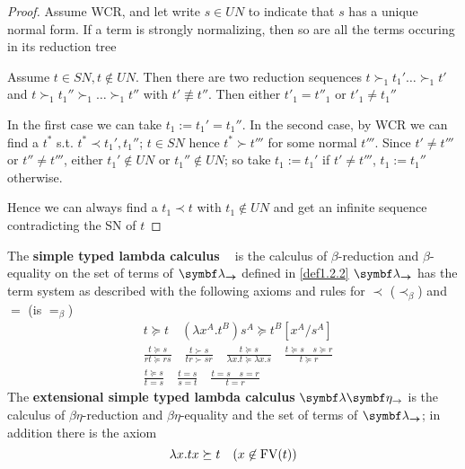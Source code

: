 \documentclass[11pt]{article}
\DeclareMathOperator{\blambdato}{\symbf{\lambda_\to}}
\begin{document}
\begin{proof}
Assume WCR, and let write \(s\in UN\) to indicate that \(s\) has a unique normal
form. If a term is strongly normalizing, then so are all the terms occuring
in its reduction tree

Assume \(t\in SN, t\not\in UN\). Then there are two reduction sequences
\(t\succ_1 t_1'\dots\succ_1 t'\) and \(t\succ_1 t_1''\succ_1\dots\succ_1 t''\) with
\(t'\not\equiv t''\). Then either \(t'_1=t''_1\) or \(t'_1\neq t_1''\)

In the first case we can take \(t_1:=t_1'=t_1''\). In the second case, by WCR
we can find a \(t^*\) s.t. \(t^*\prec t_1',t_1''\); \(t\in SN\) hence \(t^*\succ
   t'''\) for some normal \(t'''\). Since \(t'\neq t'''\) or \(t''\neq t'''\), either
\(t_1'\not\in UN\) or \(t_1''\not\in UN\); so take \(t_1:=t_1'\) if \(t'\neq t'''\),
\(t_1:=t_1''\) otherwise.

Hence we can always find a \(t_1\prec t\) with \(t_1\not\in UN\) and get an
infinite sequence contradicting the SN of \(t\)
\end{proof}

\begin{definition}[]
The \textbf{simple typed lambda calculus} \(\blambdato\) is the calculus of
\(\beta\)-reduction and \(\beta\)-equality on the set of terms of \(\blambda_{\bto}\)
defined in \ref{def1.2.2}
\(\blambda_{\bto}\) has the term system as described with the following axioms and
rules for \(\prec\) (\(\prec_\beta\)) and \(=\) (is \(=_\beta\))
\begin{align*}
&t\succeq t\quad(\lambda x^A.t^B)s^A\succeq t^B[x^A/s^A]\\
&\frac{t\succeq s}{rt\succeq rs}\quad
\frac{t\succ s}{tr\succ sr}\quad
\frac{t\succeq s}{\lambda x.t\succeq\lambda x.s}\quad
\frac{t\succeq s\quad s\succeq r}{t\succeq r}\\
&\frac{t\succeq s}{t=s}\quad\frac{t=s}{s=t}\quad
\frac{t=s\quad s=r}{t=r}
\end{align*}
The \textbf{extensional simple typed lambda calculus} \(\blambda\boldeta_\to\) is the
calculus of \(\beta \eta\)-reduction and \(\beta \eta\)-equality and the set of terms
of \(\blambda_{\bto}\); in addition there is the axiom
\begin{equation*}
\lambda x.tx\succeq t\quad(x\not\in\text{FV}(t))
\end{equation*}
\end{definition}
\end{document}
